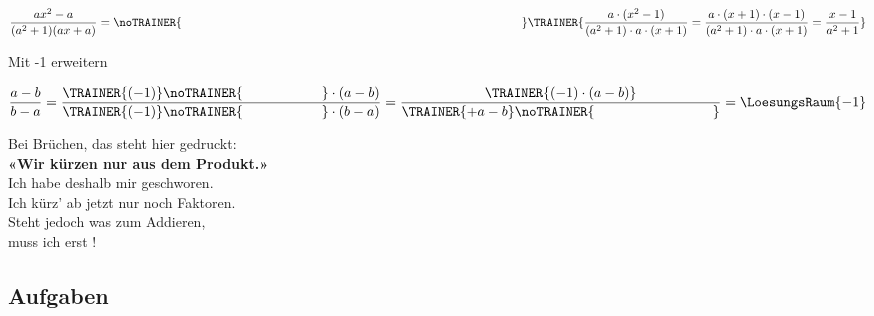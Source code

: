 \begin{beispiel}{}{}
$$\frac{ax^2 - a}{(a^2+1)(ax+a)} = \noTRAINER{\hspace{10cm}}\TRAINER{\frac{a\cdot{}(x^2-1)}{(a^2+1)\cdot{}a\cdot{}(x+1)}=\frac{a\cdot{}(x+1)\cdot{}(x-1)}{(a^2+1)\cdot{}a\cdot{}(x+1)}=\frac{x-1}{a^2+1}} $$
\end{beispiel}


\begin{beispiel}{Mit -1 erweitern}{}

$$\frac{a-b}{b-a} = \frac{\TRAINER{(-1)}\noTRAINER{\hspace{20mm}}\cdot(a-b)}{\TRAINER{(-1)}\noTRAINER{\hspace{20mm}}\cdot(b-a)}
= \frac{\TRAINER{(-1)\cdot(a-b)}}{\TRAINER{+a-b}\noTRAINER{\hspace{30mm}}} = \LoesungsRaum{-1}$$
\end{beispiel}


\vspace{5mm}

\begin{rezept}{}{}

\begin{center}Bei Brüchen, das steht hier gedruckt:\\
\textbf{«Wir kürzen nur aus dem Produkt.»}\\

Ich habe deshalb mir geschworen.\\
Ich kürz' ab jetzt nur noch Faktoren.\\

Steht jedoch was zum Addieren,\noTRAINER{\vspace{5mm}}\\
muss ich erst \noTRAINER{\hspace{5cm}}!\\
\end{center}
\end{rezept}



\subsection*{Aufgaben}
%
%

